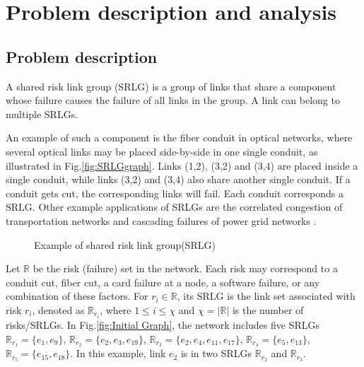 \section{Problem description and analysis}
\label{sec:Problem}

\subsection{Problem description}
A shared risk link group (SRLG) is a group of links that share a component whose failure causes the failure of all links in the group. A link can belong to multiple SRLGs.

An example of such a component is the fiber conduit \cite{bhandari1994optimal} in optical networks, where several optical links may be placed side-by-side in one single conduit, as illustrated in Fig.\ref{fig:SRLGgraph}. Links (1,2), (3,2) and (3,4) are placed inside a single conduit, while links (3,2) and (3,4) also share another single conduit. If a conduit gets cut, the corresponding links will fail. Each conduit corresponds a SRLG.  Other example applications of SRLGs are the correlated congestion of transportation networks and cascading failures of power grid networks \cite{coudert2007shared}.
\begin{figure}[htbp]

  \centering
{}
\caption{Example of shared risk link group(SRLG)}\label{fig:SRLGgraph}
\label{fig:Logic shift operation}

\end{figure}

Let $\mathbb{R}$ be the risk (failure) set in the network. Each risk may correspond to a conduit cut,  fiber cut, a card failure at a node, a software failure, or any combination of these factors. For $r_i \in \mathbb{R}$, its SRLG is the link set associated with risk $r_i$, denoted as $\mathbb{R}_{r_i}$, where $1\leq i\leq \chi$ and $\chi=|{\mathbb{R}}|$ is the number of risks/SRLGs.  In Fig.\ref{fig:Initial Graph}, the network includes five SRLGs $\mathbb{R}_{r_1}=\{e_1,e_9\}$, $\mathbb{R}_{r_2}=\{e_2,e_3,e_{19}\}$, $\mathbb{R}_{r_3}=\{e_2,e_4,e_{11},e_{17}\}$, $\mathbb{R}_{r_4}=\{e_5,e_{13}\}$, $\mathbb{R}_{r_5}=\{e_{15},e_{18}\}$. In this example, link $e_2$ is in two SRLGs $\mathbb{R}_{r_2}$ and $\mathbb{R}_{r_3}$.

